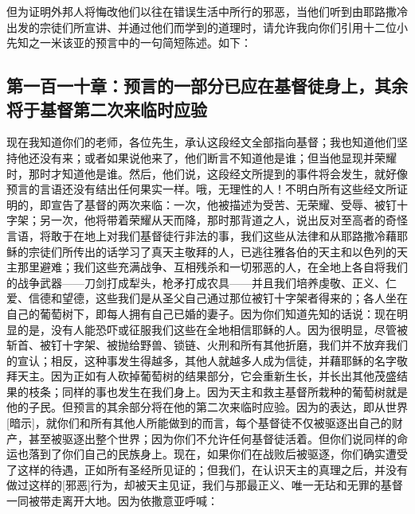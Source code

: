 但为证明外邦人将悔改他们以往在错误生活中所行的邪恶，当他们听到由耶路撒冷出发的宗徒们所宣讲、并通过他们而学到的道理时，请允许我向你们引用十二位小先知之一米该亚的预言中的一句简短陈述。如下：\par


\subsection{第一百一十章：预言的一部分已应在基督徒身上，其余将于基督第二次来临时应验}

现在我知道你们的老师，各位先生，承认这段经文全部指向基督；我也知道他们坚持他还没有来；或者如果说他来了，他们断言不知道他是谁；但当他显现并荣耀时，那时才知道他是谁。然后，他们说，这段经文所提到的事件将会发生，就好像预言的言语还没有结出任何果实一样。哦，无理性的人！不明白所有这些经文所证明的，即宣告了基督的两次来临：一次，他被描述为受苦、无荣耀、受辱、被钉十字架；另一次，他将带着荣耀从天而降，那时那背道之人，说出反对至高者的奇怪言语，将敢于在地上对我们基督徒行非法的事，我们这些从法律和从耶路撒冷藉耶稣的宗徒们所传出的话学习了真天主敬拜的人，已逃往雅各伯的天主和以色列的天主那里避难；我们这些充满战争、互相残杀和一切邪恶的人，在全地上各自将我们的战争武器——刀剑打成犁头，枪矛打成农具——并且我们培养虔敬、正义、仁爱、信德和望德，这些我们是从圣父自己通过那位被钉十字架者得来的；各人坐在自己的葡萄树下，即每人拥有自己已婚的妻子。因为你们知道先知的话说：现在明显的是，没有人能恐吓或征服我们这些在全地相信耶稣的人。因为很明显，尽管被斩首、被钉十字架、被抛给野兽、锁链、火刑和所有其他折磨，我们并不放弃我们的宣认；相反，这种事发生得越多，其他人就越多人成为信徒，并藉耶稣的名字敬拜天主。因为正如有人砍掉葡萄树的结果部分，它会重新生长，并长出其他茂盛结果的枝条；同样的事也发生在我们身上。因为天主和救主基督所栽种的葡萄树就是他的子民。但预言的其余部分将在他的第二次来临时应验。因为的表达，即从世界[暗示]，就你们和所有其他人所能做到的而言，每个基督徒不仅被驱逐出自己的财产，甚至被驱逐出整个世界；因为你们不允许任何基督徒活着。但你们说同样的命运也落到了你们自己的民族身上。现在，如果你们在战败后被驱逐，你们确实遭受了这样的待遇，正如所有圣经所见证的；但我们，在认识天主的真理之后，并没有做过这样的[邪恶]行为，却被天主见证，我们与那最正义、唯一无玷和无罪的基督一同被带走离开大地。因为依撒意亚呼喊：\par

